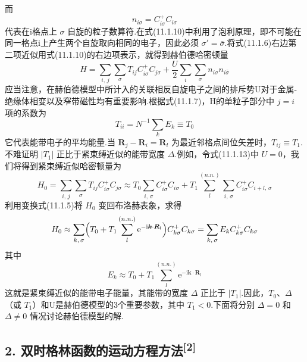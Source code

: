 而
\begin{equation}
  n_{i\sigma}=C^{+}_{i\sigma}C_{i\sigma}
\end{equation}
代表在i格点上 $\sigma$ 自旋的粒子数算符.在式(11.1.10)中利用了泡利原理，即不可能在同一格点i上产生两个自旋取向相同的电子，因此必须 $\sigma'=\bar{\sigma}$.将式(11.1.6)右边第二项近似用式(11.1.10)的右边项表示，就得到赫伯德哈密顿量
\begin{equation}
  H=\sum_{i,\,j}\sum_{\sigma}T_{ij}C^{+}_{i\sigma}C_{j\sigma}
  +\frac{U}{2}\sum_{i}\sum_{\sigma}n_{i\sigma}n_{i\bar{\sigma}}
\end{equation}
应当注意，在赫伯德模型中所计入的关联相反自旋电子之间的排斥势U对于金属-绝缘体相变以及窄带磁性均有重要影响.根据式(11.1.7)，H的单粒子部分中 $j=i$ 项的系数为
\begin{equation}
  T_{ii}=N^{-1}\sum_{k}E_{k}\equiv T_{0}
\end{equation}
它代表能带电子的平均能量.当 $\boldsymbol{R}_{j}-\boldsymbol{R}_{i}=\boldsymbol{R}_{l}$ 为最近邻格点间位矢差时，$T_{ij}\equiv T_{1}$.不难证明 $|T_{1}|$ 正比于紧束缚近似的能带宽度 $\Delta$.例如，令式(11.1.13)中 $U=0$，我们将得到紧束缚近似哈密顿量为
\begin{equation}
  H_{0}=\sum_{i,\,j}\sum_{\sigma}T_{ij}C^{+}_{i\sigma}C_{j\sigma}
  \approx T_{0}\sum_{i,\,\sigma}C^{+}_{i\sigma}C_{i\sigma}
  +T_{1}\sum_{l}^{(n.n.)}\sum_{i,\,\sigma}C^{+}_{i\sigma}C_{i+l,\,\sigma}
\end{equation}
利用变换式(11.1.5)将 $H_{0}$ 变回布洛赫表象，求得
\begin{equation}
  H_{0}\approx\sum_{k,\,\sigma}\Bigl(T_{0}
  +T_{1}\sum_{l}^{(n.n.)}\mathrm{e}^{-\mathrm{i}\boldsymbol{k}\cdot\boldsymbol{R}_{l}}\Bigr)
  C^{+}_{k\sigma}C_{k\sigma}
  =\sum_{k,\,\sigma}E_{k}C^{+}_{k\sigma}C_{k\sigma}
\end{equation}
其中
\begin{equation}
  E_{k}\approx T_{0}+T_{1}\sum_{l}^{(n.n.)}
  \mathrm{e}^{-\mathrm{i}\boldsymbol{k}\cdot\boldsymbol{R}_{l}}
\end{equation}
这就是紧束缚近似的能带电子能量，其能带的宽度 $\Delta$ 正比于 $|T_{1}|$.因此，$T_{0}$、$\Delta$（或 $T_{1}$）和U是赫伯德模型的3个重要参数，其中 $T_{1}<0$.下面将分别 $\Delta=0$ 和 $\Delta\neq0$ 情况讨论赫伯德模型的解.

\subsection*{2. 双时格林函数的运动方程方法\textsuperscript{[2]}}

